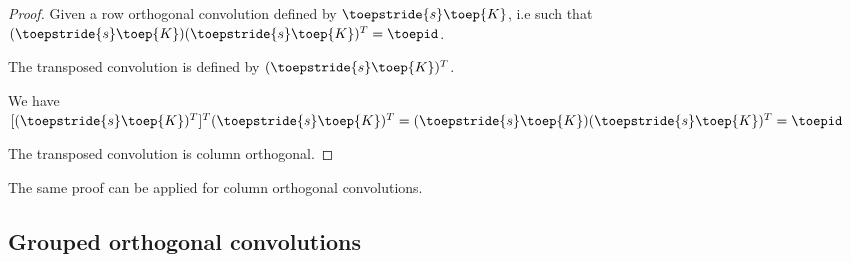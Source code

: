 \begin{proof}
Given a row orthogonal convolution defined by $\toepstride{s} \toep{K}$, i.e such that $ (\toepstride{s} \toep{K})(\toepstride{s} \toep{K})^T = \toepid$.

The transposed convolution is defined by $(\toepstride{s} \toep{K})^T$.

We have $[(\toepstride{s} \toep{K})^T]^T(\toepstride{s} \toep{K})^T=(\toepstride{s} \toep{K})(\toepstride{s} \toep{K})^T = \toepid$

The transposed convolution is column orthogonal.
\end{proof}

The same proof can be applied for  column orthogonal convolutions. 


\subsection{Grouped orthogonal convolutions}
\label{sec:ap_proof_grouped}

